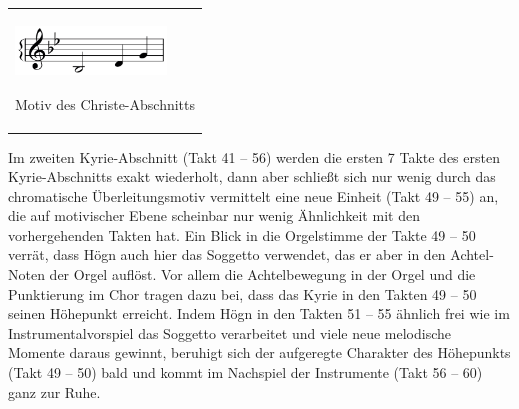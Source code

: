 \begin{center}
\begin{minipage}{4.394cm}
\begin{flushleft}
\tablefirsthead{}
\tablehead{}
\tabletail{}
\tablelasttail{}
\begin{supertabular}{m{4.1940002cm}}

\includegraphics[width=4.011cm,height=1.378cm]{pictures/zulassungsarbeit-img119.png}

Motiv des Christe-Abschnitts\\
\end{supertabular}
\end{flushleft}
\end{minipage}
\end{center}
Im zweiten Kyrie-Abschnitt (Takt 41 – 56) werden die ersten 7 Takte des
ersten Kyrie-Abschnitts exakt wiederholt, dann aber schließt sich nur
wenig durch das chromatische Überleitungsmotiv vermittelt eine neue
Einheit (Takt 49 – 55) an, die auf motivischer Ebene scheinbar nur
wenig Ähnlichkeit mit den vorhergehenden Takten hat. Ein Blick in die
Orgelstimme der Takte 49 – 50 verrät, dass Högn auch hier das Soggetto
verwendet, das er aber in den Achtel-Noten der Orgel auflöst. Vor allem
die Achtelbewegung in der Orgel und die Punktierung im Chor tragen dazu
bei, dass das Kyrie in den Takten 49 – 50 seinen Höhepunkt erreicht.
Indem Högn in den Takten 51 – 55 ähnlich frei wie im
Instrumentalvorspiel das Soggetto verarbeitet und viele neue melodische
Momente daraus gewinnt, beruhigt sich der aufgeregte Charakter des
Höhepunkts (Takt 49 – 50) bald und kommt im Nachspiel der Instrumente
(Takt 56 – 60) ganz zur Ruhe.


